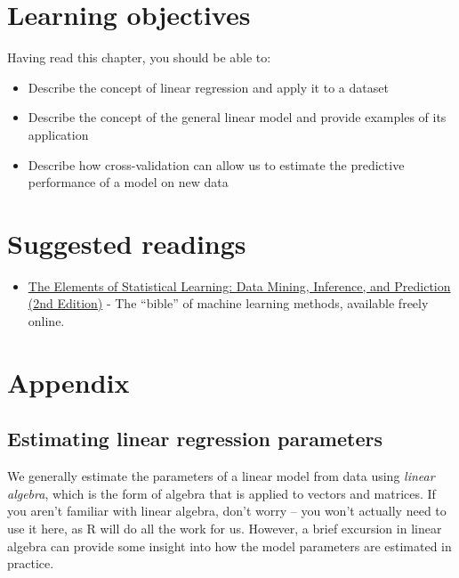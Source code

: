 \documentclass[12pt,]{book}
\providecommand{\tightlist}{%
  \setlength{\itemsep}{0pt}\setlength{\parskip}{0pt}}
\theoremstyle{definition}
\theoremstyle{definition}
\theoremstyle{definition}
\theoremstyle{remark}
\begin{document}
\hypertarget{learning-objectives-13}{%
\section{Learning objectives}\label{learning-objectives-13}}

Having read this chapter, you should be able to:

\begin{itemize}
\tightlist
\item
  Describe the concept of linear regression and apply it to a dataset
\item
  Describe the concept of the general linear model and provide examples of its application
\item
  Describe how cross-validation can allow us to estimate the predictive performance of a model on new data
\end{itemize}

\hypertarget{suggested-readings-10}{%
\section{Suggested readings}\label{suggested-readings-10}}

\begin{itemize}
\tightlist
\item
  \href{https://web.stanford.edu/~hastie/Papers/ESLII.pdf}{The Elements of Statistical Learning: Data Mining, Inference, and Prediction (2nd Edition)} - The ``bible'' of machine learning methods, available freely online.
\end{itemize}

\hypertarget{appendix-5}{%
\section{Appendix}\label{appendix-5}}

\hypertarget{estimating-linear-regression-parameters}{%
\subsection{Estimating linear regression parameters}\label{estimating-linear-regression-parameters}}

We generally estimate the parameters of a linear model from data using \emph{linear algebra}, which is the form of algebra that is applied to vectors and matrices. If you aren't familiar with linear algebra, don't worry -- you won't actually need to use it here, as R will do all the work for us. However, a brief excursion in linear algebra can provide some insight into how the model parameters are estimated in practice.
\end{document}
